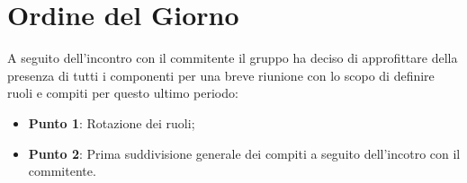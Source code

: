 \section{Ordine del Giorno}
A seguito dell'incontro con il commitente il gruppo ha deciso di approfittare della presenza di tutti i componenti per una breve riunione con lo scopo di definire ruoli e compiti per questo ultimo periodo:
\begin{itemize}
	\item \textbf{Punto 1}: Rotazione dei ruoli;
	\item \textbf{Punto 2}: Prima suddivisione generale dei compiti a seguito dell'incotro con il commitente.
\end{itemize}